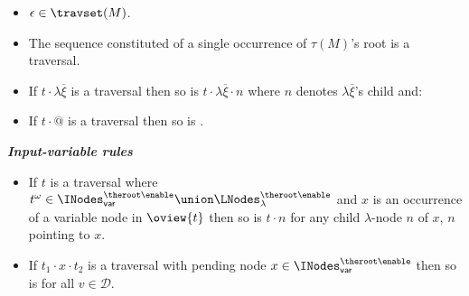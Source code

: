 \begin{FramedTable}
\begin{itemize}[]
\item{} $\epsilon \in \travset(M)$.
\item{} The sequence constituted of a single occurrence of $\tau(M)$'s root is a traversal.
\end{itemize}

\begin{itemize}[]
    \item {} If $t \cdot \lambda \overline{\xi}$ is a traversal then so is
        $t \cdot \lambda \overline{\xi} \cdot n$ where $n$
        denotes $\lambda \overline{\xi}$'s child and:
    \item {} If $t \cdot @$ is a traversal then so is .
\end{itemize}

\emph{\bf Input-variable rules}
\begin{itemize}[]
\item {} If $t$ is a traversal where $t^\omega \in \INodes_{\sf var}^{\theroot\enable} \union \LNodes_\lambda^{\theroot\enable}$
and $x$ is an occurrence of a variable node in $\oview{t}$ then
so is $t \cdot n$ for any child $\lambda$-node $n$ of $x$, $n$
pointing to $x$.



\item {} If $t_1
\cdot x \cdot t_2$ is a traversal with pending node $x \in
\INodes_{\sf var}^{\theroot\enable}$ then so is  for all $v \in
\mathcal{D}$.
\end{itemize}


\end{FramedTable}
